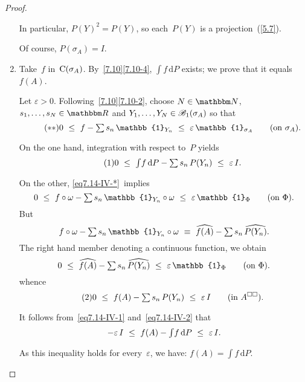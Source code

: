 \documentclass[main.tex]{subfiles}
\begin{document}
\begin{proof}
\begin{enumerate}[label=(\Roman*)]
In particular,
$P(Y)^2=P(Y)$,
so each~$P(Y)$ is a projection~(\ref{5.7}).

Of course, $P(\sigma_A)=I$.
%
\item\label{7.14-IV}
Take~$f$ in~$\mathrm{C}(\sigma_{A})$.
By~\ref{7.10}\ref{7.10-4},
$\int f\,\mathrm{d}P$ exists;
we prove that it equals~$f(A)$.

Let $\varepsilon>0$.
Following~\ref{7.10}\ref{7.10-2},
choose $N\in\N$,
$s_1,\dotsc,s_N\in\R$
and $Y_1,\dotsc,Y_N\in\mathscr{B}_1(\sigma_{A})$ so that
\begin{equation}
\label{eq7.14-IV-*}\tag{$**$}
0\ \leq\ f-{\textstyle\sum}\,s_n\,\mathbb{1}_{Y_n}
\ \leq\ \varepsilon\,\mathbb{1}_{\Sp{A}}\qquad(\htam{on }\Sp{A})\htam{.}
\end{equation}

On the one hand,
integration with respect to~$P$ yields
\begin{equation}
\label{eq7.14-IV-1}\tag{$1$}
0\ \leq\ {\textstyle\int}f\,\mathrm{d}P - 
{\textstyle\sum}\,s_n\,P(Y_n)\ \leq\ \varepsilon\,I\text{.}
\end{equation}

On the other,
\eqref{eq7.14-IV-*}~implies
\begin{equation*}
0\ \leq\ f\circ\omega -{\textstyle\sum}\,s_n\,\mathbb{1}_{Y_n}\circ\omega
\ \leq\ \varepsilon\,\mathbb{1}_\Phi\qquad(\htam{on }\Phi)\htam{.}
\end{equation*}
But
\begin{equation*}
f\circ\omega - {\textstyle\sum}\,s_n\,\mathbb{1}_{Y_n}\circ\omega
\ \equiv\ \widehat{f(A)} - {\textstyle\sum}\,s_n\,\widehat{P(Y_n)}\htam{.}
\end{equation*}
The right hand member denoting a continuous function,
we obtain
\begin{equation*}
0\ \leq\ \widehat{f(A)} - {\textstyle\sum}\,s_n\,\widehat{P(Y_n)}
\ \leq\ \varepsilon\,\mathbb{1}_\Phi\qquad(\htam{on }\Phi)\htam{.}
\end{equation*}
whence
\begin{equation}
\label{eq7.14-IV-2}\tag{$2$}
0\ \leq\ f(A)-{\textstyle\sum}\,s_n\,P(Y_n)\ \leq\ \varepsilon\,I
\qquad(\text{in }A^{\square\square})\text{.}
\end{equation}

It follows from~\eqref{eq7.14-IV-1} and~\eqref{eq7.14-IV-2} that
\begin{equation*}
-\varepsilon\,I\ \leq\ f(A)-{\textstyle\int}f\,\mathrm{d}P
\ \leq\ \varepsilon\,I\htam{.}
\end{equation*}

As this inequality holds for every~$\varepsilon$,
we have: $f(A)=\int f\,\mathrm{d}P$. \xqed
\end{enumerate}
\end{proof}
\end{document}
